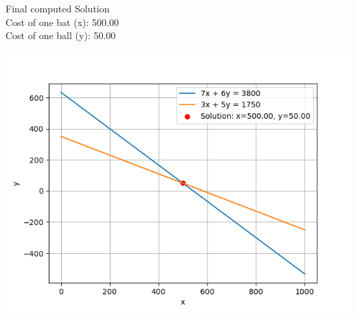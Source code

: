 \documentclass[journal]{IEEEtran}
\begin{document}
Final computed Solution \\
Cost of one bat (x): 500.00\\
Cost of one ball (y): 50.00\\
\begin{center}
    \includegraphics[width=0.75\columnwidth]{figs/fig33.png}
\end{center}
\end{document}
